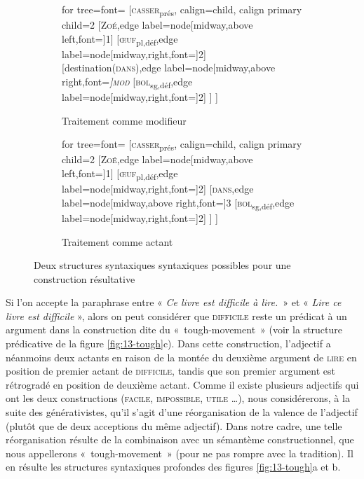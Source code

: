 {\begin{figure}[H]
	\begin{subfigure}[b]{0.5\textwidth}
		\centering
		\begin{forest} for tree={font=\normalfont}
			[\textsc{casser}\textsubscript{prés}, calign=child, calign primary child=2
			[\textsc{Zoé},edge label={node[midway,above left,font=\footnotesize]{1}}]
			[\textsc{œuf}\textsubscript{pl,déf},edge label={node[midway,right,font=\footnotesize]{2}}]
			[destination(\textsc{dans}),edge label={node[midway,above right,font=\footnotesize\itshape]{\textsc{mod}}}
			[\textsc{bol}\textsubscript{sg,déf},edge label={node[midway,right,font=\footnotesize]{2}}]
			]
			]
		\end{forest}
		\caption{Traitement comme modifieur}
	\end{subfigure}%
	\hfill
	\begin{subfigure}[b]{0.5\textwidth}
		\centering
		\begin{forest} for tree={font=\normalfont}
			[\textsc{casser}\textsubscript{prés}, calign=child, calign primary child=2
			[\textsc{Zoé},edge label={node[midway,above left,font=\footnotesize]{1}}]
			[\textsc{œuf}\textsubscript{pl,déf},edge label={node[midway,right,font=\footnotesize]{2}}]
			[\textsc{dans},edge label={node[midway,above right,font=\footnotesize]{3}}
			[\textsc{bol}\textsubscript{sg,déf},edge label={node[midway,right,font=\footnotesize]{2}}]
			]
			]
		\end{forest}
		\caption{Traitement comme actant}
	\end{subfigure}
\caption{Deux structures syntaxiques syntaxiques possibles pour une construction résultative}
\end{figure}

 Si l’on accepte la paraphrase entre « \textit{Ce livre est difficile à lire.}~» et « \textit{Lire ce livre est difficile} », alors on peut considérer que \textsc{difficile} reste un prédicat à un argument dans la construction dite du «~tough-movement~» (voir la structure prédicative de la figure \ref{fig:13-tough}c). Dans cette construction, l'adjectif a néanmoins deux actants en raison de la montée du deuxième argument de \textsc{lire} en position de premier actant de \textsc{difficile}, tandis que son premier argument est rétrogradé en position de deuxième actant. Comme il existe plusieurs adjectifs qui ont les deux constructions (\textsc{facile}, \textsc{impossible}, \textsc{utile} …), nous considérerons, à la suite des générativistes, qu’il s’agit d’une réorganisation de la valence de l’adjectif (plutôt que de deux acceptions du même adjectif). Dans notre cadre, une telle réorganisation résulte de la combinaison avec un sémantème constructionnel, que nous appellerons «~{tough-movement}~» (pour ne pas rompre avec la tradition). Il en résulte les structures syntaxiques profondes des figures \ref{fig:13-tough}a et b.

}
